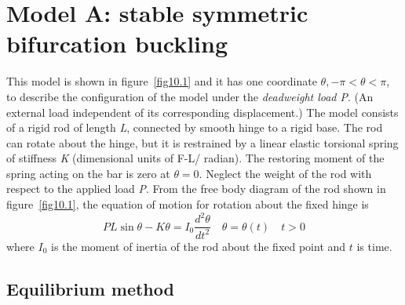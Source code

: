 \documentclass{AeroStructure-ERJohnson}
\begin{document}
\section{Model A: stable symmetric bifurcation buckling}\label{sec10.1}


This model is shown in figure~\ref{fig10.1} and it has one coordinate $\theta, -\pi < \theta < \pi$, to describe the configuration of the model under the \textit{deadweight load P}. (An external load independent of its corresponding displacement.) The model consists of a rigid rod of length \textit{L}, connected by smooth hinge to a rigid base. The rod can rotate about the hinge, but it is restrained by a linear elastic torsional spring of stiffness \textit{K} (dimensional units of F-L/ radian). The restoring moment of the spring acting on the bar is zero at $\theta = 0$. Neglect the weight of the rod with respect\vadjust{\vspace*{10pt}\pagebreak} to the applied load \textit{P}. From the free body diagram of the rod shown in figure~\ref{fig10.1}, the equation of motion for rotation about the fixed hinge is
\begin{equation}\label{eq10.1}
P L \sin \theta-K \theta=I_{0} \frac{d^{2} \theta}{d t^{2}} \quad \theta=\theta(t) \quad t>0
\end{equation}
where ${I_0}$ is the moment of inertia of the rod about the fixed point and $t$ is time.





\subsection{Equilibrium method}\label{sec10.1.1}
\end{document}
